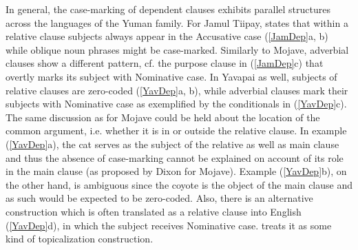 
In general, the case-marking of dependent clauses exhibits parallel structures across the languages of the Yuman family.
For {Jamul Tiipay}, \citet[210]{Miller:2001} states that within a relative clause subjects always appear in the Accusative case (\ref{JamDep}a, b) while oblique noun phrases might be case-marked. 
Similarly to Mojave, adverbial clauses show a different pattern, cf. the purpose clause in (\ref{JamDep}c) that overtly marks its subject with Nominative  case.
In Yavapai as well, subjects of  relative clauses are zero-coded (\ref{YavDep}a, b), while adverbial clauses mark their subjects with Nominative  case as exemplified by the conditionals in (\ref{YavDep}c). 
The same discussion as for Mojave could be held about the location of the common argument, i.e. whether it is in or outside the relative clause. 
In example (\ref{YavDep}a), the cat serves as the subject of the relative as well as main clause and thus the absence of case-marking cannot be explained on account of its role in the main clause (as proposed by Dixon for Mojave). 
Example (\ref{YavDep}b), on the other hand, is ambiguous since the coyote is the object of the main clause and as such would be expected to be zero-coded. 
Also, there is an alternative construction which is often translated as a relative clause into English (\ref{YavDep}d), in which the subject receives Nominative  case. \citet[221]{Kendall:1976} treats it as some kind of topicalization construction.

